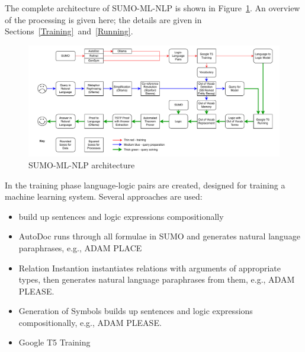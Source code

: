 \documentclass[runningheads]{llncs}
\begin{document}
The complete architecture of SUMO-ML-NLP is shown in Figure~\ref{ArchitecturePicture}.
An overview of the processing is given here; the details are given in 
Sections~\ref{Training}~and~\ref{Running}.

\begin{figure}
\includegraphics[width=\textwidth]{Architecture.pdf}
\caption{SUMO-ML-NLP architecture}
\label{ArchitecturePicture}
\end{figure}

In the training phase language-logic pairs are created, designed for training a machine learning 
system. 
Several approaches are used:

\begin{itemize}
\item build up sentences and logic expressions compositionally
\end{itemize}

\begin{itemize}
\item AutoDoc runs through all formulae in SUMO and generates natural language paraphrases,
      e.g., ADAM PLACE
\item Relation Instantion instantiates relations with arguments of appropriate types, then 
      generates natural language paraphrases from them, e.g., ADAM PLEASE.
\item Generation of Symbols builds up sentences and logic expressions compositionally, e.g.,
      ADAM PLEASE.
\item Google T5 Training
\end{itemize}
\end{document}
